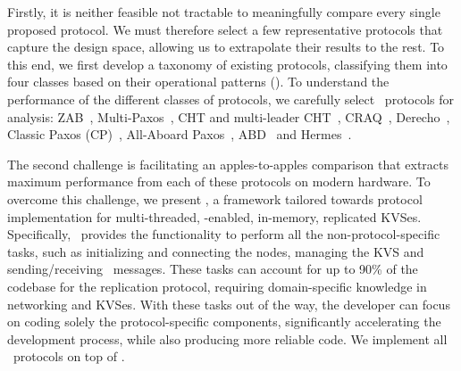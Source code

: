 Firstly, it is neither feasible not tractable to meaningfully compare every single proposed protocol.
We must therefore select a few representative protocols that capture the design space, allowing us to extrapolate their results to the rest. 
To this end, we first develop a taxonomy of existing protocols, classifying them into four classes based on their operational patterns ().
To understand the performance of the different classes of protocols, we carefully select \pnum~protocols for analysis:
ZAB~\cite{Hunt:2010},  
Multi-Paxos~\cite{Lamport:2001}, 
CHT and multi-leader CHT~\cite{Chandra:2016}, 
CRAQ~\cite{Terrace:2009}, 
Derecho~\cite{Jha:2019}, 
Classic Paxos (CP)~\cite{Lamport:1998}, 
All-Aboard Paxos~\cite{Howard:2019}, 
ABD~\cite{Lynch:1997} and 
Hermes~\cite{A:2020}. 


The second challenge is facilitating 
an apples-to-apples comparison that extracts maximum performance from each of these protocols on modern hardware. 
To overcome this challenge, 
we present \odlib, a framework tailored towards protocol implementation for multi-threaded, \RDMA-enabled, in-memory, replicated KVSes. 
Specifically, \odlib\ provides the functionality to perform all the non-protocol-specific tasks, such as initializing and connecting the nodes, managing the KVS and sending/receiving \RDMA\ messages.
These tasks can account for up to 90\% of the codebase for the replication protocol, requiring domain-specific knowledge in networking and KVSes. With these tasks out of the way, the developer can focus on coding solely the protocol-specific components, significantly accelerating the development process, while also producing more reliable code. We implement all \pnum~protocols on top of \odlib. 

\begin{comment}
\begin{tcolorbox}
\beginbsec{Pop Quiz}
Can you order the above ten protocols by their throughput? How will the order change if the protocols are single-threaded vs. multi-threaded? \\
\beginbsec{Answer} \figref{fig:three-bars} 
\end{tcolorbox}
\end{comment}

